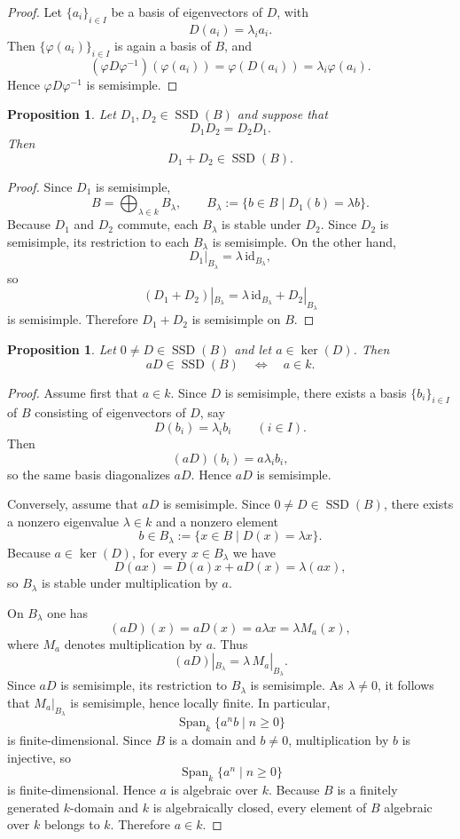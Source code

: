 \documentclass[12pt]{amsart}
\newtheorem{proposition}[theorem]{Proposition}
\newcommand{\Span}{\operatorname{Span}}
\newcommand{\SSD}{\operatorname{SSD}}
\newcommand{\id}{\mathrm{id}}
\begin{document}
\begin{proof}
Let $\{a_i\}_{i\in I}$ be a basis of eigenvectors of $D$, with
\[
D(a_i)=\lambda_i a_i.
\]
Then $\{\varphi(a_i)\}_{i\in I}$ is again a basis of $B$, and
\[
(\varphi D\varphi^{-1})(\varphi(a_i))
=
\varphi(D(a_i))
=
\lambda_i\varphi(a_i).
\]
Hence $\varphi D\varphi^{-1}$ is semisimple.
\end{proof}

\begin{proposition}
Let $D_1,D_2\in \SSD(B)$ and suppose that
\[
D_1D_2=D_2D_1.
\]
Then
\[
D_1+D_2\in \SSD(B).
\]
\end{proposition}

\begin{proof}
Since $D_1$ is semisimple,
\[
B=\bigoplus_{\lambda\in k} B_\lambda,
\qquad
B_\lambda:=\{b\in B\mid D_1(b)=\lambda b\}.
\]
Because $D_1$ and $D_2$ commute, each $B_\lambda$ is stable under $D_2$. Since $D_2$ is semisimple, its restriction to each $B_\lambda$ is semisimple. On the other hand,
\[
D_1|_{B_\lambda}=\lambda\,\id_{B_\lambda},
\]
so
\[
(D_1+D_2)|_{B_\lambda}
=
\lambda\,\id_{B_\lambda}+D_2|_{B_\lambda}
\]
is semisimple. Therefore $D_1+D_2$ is semisimple on $B$.
\end{proof}

\begin{proposition}\label{prop:aD-semisimple}
Let $0\neq D\in \SSD(B)$ and let $a\in \ker(D)$. Then
\[
aD\in \SSD(B)
\quad\Longleftrightarrow\quad
a\in k.
\]
\end{proposition}

\begin{proof}
Assume first that $a\in k$. Since $D$ is semisimple, there exists a basis
$\{b_i\}_{i\in I}$ of $B$ consisting of eigenvectors of $D$, say
\[
D(b_i)=\lambda_i b_i \qquad (i\in I).
\]
Then
\[
(aD)(b_i)=a\lambda_i b_i,
\]
so the same basis diagonalizes $aD$. Hence $aD$ is semisimple.

Conversely, assume that $aD$ is semisimple. Since $0\neq D\in \SSD(B)$,
there exists a nonzero eigenvalue $\lambda\in k$ and a nonzero element
\[
b\in B_\lambda:=\{x\in B\mid D(x)=\lambda x\}.
\]
Because $a\in \ker(D)$, for every $x\in B_\lambda$ we have
\[
D(ax)=D(a)x+aD(x)=\lambda(ax),
\]
so $B_\lambda$ is stable under multiplication by $a$.

On $B_\lambda$ one has
\[
(aD)(x)=aD(x)=a\lambda x=\lambda M_a(x),
\]
where $M_a$ denotes multiplication by $a$. Thus
\[
(aD)|_{B_\lambda}=\lambda\,M_a|_{B_\lambda}.
\]
Since $aD$ is semisimple, its restriction to $B_\lambda$ is semisimple. As $\lambda\neq 0$,
it follows that $M_a|_{B_\lambda}$ is semisimple, hence locally finite. In particular,
\[
\Span_k\{a^n b\mid n\ge 0\}
\]
is finite-dimensional. Since $B$ is a domain and $b\neq 0$, multiplication by $b$ is injective, so
\[
\Span_k\{a^n\mid n\ge 0\}
\]
is finite-dimensional. Hence $a$ is algebraic over $k$. Because $B$ is a finitely generated
$k$-domain and $k$ is algebraically closed, every element of $B$ algebraic over $k$ belongs to $k$.
Therefore $a\in k$.
\end{proof}
\end{document}
